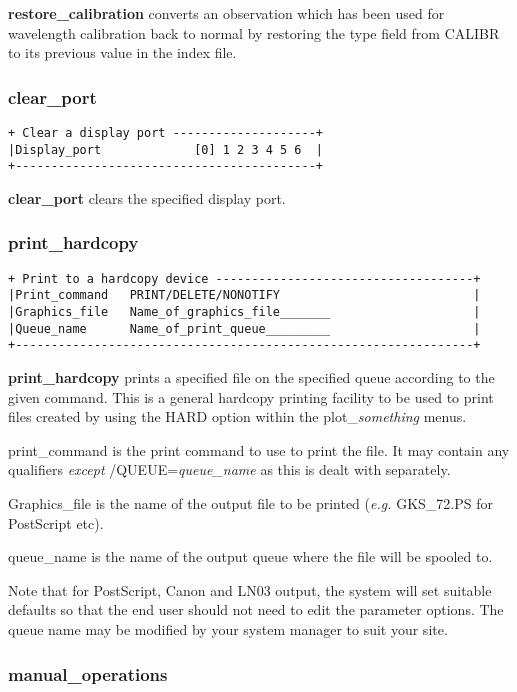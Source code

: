 {{\bf restore\_calibration} converts an observation which has been used 
for wavelength calibration back to normal by restoring the type field from
{\sf CALIBR} to its previous value in the index file.

\subsubsection{clear\_port}
\begin{verbatim}
+ Clear a display port --------------------+
|Display_port             [0] 1 2 3 4 5 6  |
+------------------------------------------+
\end{verbatim}

{\bf clear\_port} clears the specified display port.

\subsubsection{print\_hardcopy}
\begin{verbatim}
+ Print to a hardcopy device ------------------------------------+
|Print_command   PRINT/DELETE/NONOTIFY                           |
|Graphics_file   Name_of_graphics_file_______                    |
|Queue_name      Name_of_print_queue_________                    |
+----------------------------------------------------------------+
\end{verbatim}

{\bf print\_hardcopy} prints a specified file on the specified queue 
according to the given command. This is a general hardcopy printing 
facility to be used to print files created by using the HARD option within 
the {\sf plot\_{\em something}} menus.

{\sf print\_command} is the print command to use to print the file. It 
may contain any qualifiers {\em except} {\sf /QUEUE={\em queue\_name}} 
as this is dealt with separately. 

{\sf Graphics\_file} is the name of the output file to be printed ({\em e.g.}
{\sf GKS\_72.PS} for PostScript etc).

{\sf queue\_name} is the name of the output queue where the file will be 
spooled to. 

Note that for PostScript, Canon and LN03 output, the system will set suitable
defaults so that the end user should not need to edit the parameter options.
The queue name may be modified by your system manager to suit your site.

\subsubsection{manual\_operations}
\label{manual_operations}

}
